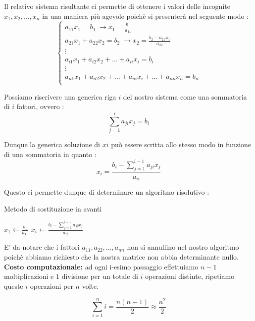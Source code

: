 \documentclass[12pt, a4paper]{book}
\theoremstyle{definition}
\begin{document}
\begin{flushleft}
\begin{enumerate}
	Il relativo sistema risultante ci permette di ottenere i valori delle incognite $x_{1},x_{2}, \dots, x_{n}$ in una maniera più agevole  poichè si presenterà nel seguente modo : 	
	\[ 
		\begin{cases}
  				a_{11}x_{1} = b_{1} \; \longrightarrow x_{1} = \frac{b_{1}}{a_{11}} \\   
       			a_{21}x_{1} + a_{22}x_{2} = b_{2} \; \longrightarrow x_{2} = \frac{b_{2}- a_{21}x_{1}}{a_{22}}  \\
       			\vdots \\
       			a_{i1}x_{1} + a_{i2}x_{2}  + \dots + a_{ii}x_{i} = b_{i} \\
       			\vdots \\
  				a_{n1}x_{1} + a_{n2}x_{2}  + \dots + a_{ni}x_{i} + \dots + a_{nn}x_{n} = b_{n} \\
		\end{cases}	
	\]
	
	Possiamo riscrivere una generica riga $i$ del nostro sistema come una sommatoria di $i$ fattori, ovvero : 
	\[
		\sum_{j = 1} ^ {i} a_{ji}x_{j} = b_{i}
	\]	
	
	Dunque la generica soluzione di $xi$ può essere scritta allo stesso modo in funzione di una sommatoria in quanto :
	\[
		x_{i} = \frac{ b_{i} - \sum_{j = 1} ^ {i-1} a_{ji}x_{j}}{a_{ii}}
	\]	
	
	Questo ci permette dunque di determinare un algoritmo risolutivo : 
	
	\begin{algorithm}
		\caption{ Metodo di sostituzione in avanti}
		\begin{algorithmic} 
			\STATE $ x_{1} \leftarrow  \frac{b_{1}}{a_{11}}$
				\STATE $ x_{i} \leftarrow  \frac{ b_{i} - \sum_{j = 1} ^ {i-1} a_{ji}x_{j}}{a_{ii}} $
			\ENDFOR
		\end{algorithmic}
	\end{algorithm}	
	
	E' da notare che i fattori $a_{11}, a_{22}, \dots, a_{nn}$ non si annullino nel nostro algoritmo poichè abbiamo richiesto che la nostra matrice non abbia determinante nullo.\\
\vspace{1em}
\textbf{Costo computazionale:} ad ogni i-esimo passaggio effettuiamo $n-1$ moltiplicazioni e $1$ divisione per un totale di $i$ operazioni distinte,  ripetiamo queste $i$ operazioni per $n$ volte. 

\[
	\sum_{i = 1}^{n} i = \frac{n(n-1)}{2} \approx \frac{n^{2}}{2}
\]


\end{enumerate}
\end{flushleft}
\end{document}
